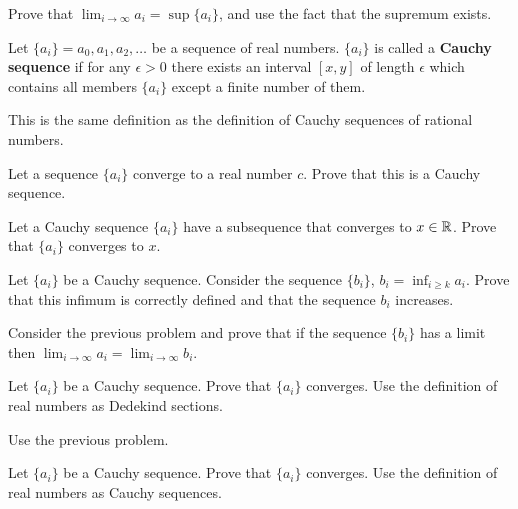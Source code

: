 \documentclass[12pt]{article}
\begin{document}
\begin{ukazanie} Prove that  $\lim_{i \to \infty} a_i  = \sup\{a_i\}$,
and use the fact that the supremum exists.
\end{ukazanie}

\begin{opredelenie} Let $\{a_i\}= a_0, a_1, a_2, \ldots$ be a sequence
  of real numbers. $\{a_i\}$ is called a {\bf Cauchy sequence} if for
  any $\epsilon >0$ there exists an interval $[x, y]$ of length
  $\epsilon$ which contains all members $\{a_i\}$ except a finite number
  of them.
\end{opredelenie}

\begin{zamechanie} This is the same definition as the definition of
  Cauchy sequences of rational numbers.
\end{zamechanie}

\begin{zadacha} Let a sequence $\{a_i\}$ converge to a real number
  $c$. Prove that this is a Cauchy sequence.
\end{zadacha}

\begin{zadacha} Let a Cauchy sequence  $\{a_i\}$ 
have a subsequence that converges to $x\in {\mathbb R}$. Prove that  $\{a_i\}$
converges to $x$.
\end{zadacha}

\begin{zadacha} Let $\{a_i\}$ be a Cauchy sequence.
Consider the sequence  $\{b_i\}$, $b_i = \inf_{i\geq k}
a_i$. Prove that this infimum is correctly defined and that the
sequence $b_i$ increases.
\end{zadacha}

\begin{zadacha} Consider the previous problem and prove that if the
  sequence $\{b_i\}$ has a limit then $\lim_{i \to \infty} a_i
  =\lim_{i \to \infty} b_i$.
\end{zadacha}

\begin{zadacha}[!] Let $\{a_i\}$ be a Cauchy sequence. Prove that
  $\{a_i\}$ converges. Use the definition of real numbers as Dedekind
  sections.
\end{zadacha}

\begin{ukazanie} Use the previous problem.
\end{ukazanie}

\begin{zadacha}[!] Let $\{a_i\}$ be a Cauchy sequence. Prove that
  $\{a_i\}$ converges. Use the definition of real numbers as Cauchy
  sequences.
\end{zadacha}
\end{document}
